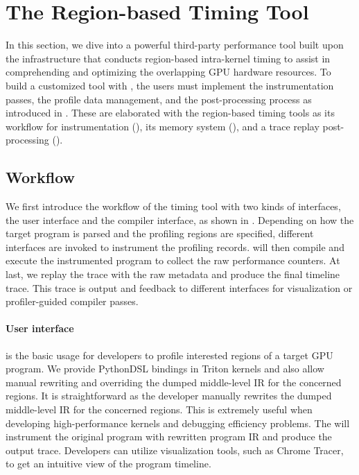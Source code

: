 
\section{The Region-based Timing Tool} \label{sec:tool}
In this section, we dive into a powerful third-party performance tool built upon the \thiswork{} infrastructure that conducts region-based intra-kernel timing to assist in comprehending and optimizing the overlapping GPU hardware resources. 
To build a customized tool with \thiswork{}, the users must implement the instrumentation passes, the profile data management, and the post-processing process as introduced in \Sec{\ref{sec:third_party}}.
These are elaborated with the region-based timing tools as its workflow for instrumentation (\Sec{\ref{sec:profiler:workflow}}), its memory system (\Sec{\ref{sec:profiler:memory}}), and a trace replay post-processing (\Sec{\ref{sec:replay}}).


\subsection{Workflow} \label{sec:profiler:workflow}



We first introduce the workflow of the timing tool with two kinds of interfaces, the user interface and the compiler interface, as shown in \Fig{\ref{fig:workflow}}.
Depending on how the target program is parsed and the profiling regions are specified, different interfaces are invoked to instrument the profiling records.
\thiswork{} will then compile and execute the instrumented program to collect the raw performance counters.
At last, we replay the trace with the raw metadata and produce the final timeline trace.
This trace is output and feedback to different interfaces for visualization or profiler-guided compiler passes.


\paragraph{User interface} is the basic usage for developers to profile interested regions of a target GPU program.
We provide PythonDSL bindings in Triton kernels and also allow manual rewriting and overriding the dumped middle-level IR for the concerned regions.
It is straightforward as the developer manually rewrites the dumped middle-level IR for the concerned regions.
This is extremely useful when developing high-performance kernels and debugging efficiency problems.
The \thiswork{} will instrument the original program with rewritten program IR and produce the output trace.
Developers can utilize visualization tools, such as Chrome Tracer\cite{chrome_trace}, to get an intuitive view of the program timeline.


